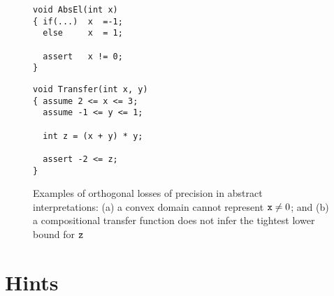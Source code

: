 \documentclass[sttt]{svjour}
\begin{document}
\begin{figure}%
 \centering
  \begin{subfloat}
    \begin{minipage}{3.5cm}
\begin{verbatim}
void AbsEl(int x) 
{ if(...)  x  =-1; 
  else     x  = 1; 

  assert   x != 0; 
}
\end{verbatim}
    \end{minipage}
    \caption{}
    \label{fig:gathering1}
  \end{subfloat}    
  \qquad 
  \begin{subfloat}
    \begin{minipage}{3.6cm}
\begin{verbatim}
void Transfer(int x, y) 
{ assume 2 <= x <= 3;
  assume -1 <= y <= 1;  
  
  int z = (x + y) * y;

  assert -2 <= z; 
}
\end{verbatim}
    \end{minipage}
\caption{}
\label{fig:transfer}
  \end{subfloat}
\vspace{-0.2cm}
\caption{Examples of orthogonal losses of precision in abstract interpretations:
(a) a convex domain cannot represent $\mathtt{x} \neq 0$; and 
(b) a compositional transfer function does not infer the tightest
lower bound for $\mathtt{z}$ 
}
\label{fig:gathering}
\vspace{-0.5cm}
\end{figure}

\section{Hints}
\end{document}
